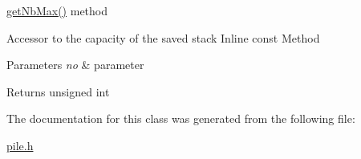 \hyperlink{class_memento_a65ff8c9c8c968294a6fc4efb56a84b72}{get\+Nb\+Max()} method 

Accessor to the capacity of the saved stack Inline const Method


\begin{DoxyParams}{Parameters}
{\em no} & parameter \\
\hline
\end{DoxyParams}
\begin{DoxyReturn}{Returns}
unsigned int 
\end{DoxyReturn}


The documentation for this class was generated from the following file\+:\begin{DoxyCompactItemize}
\item 
\hyperlink{pile_8h}{pile.\+h}\end{DoxyCompactItemize}
